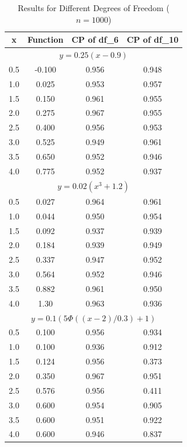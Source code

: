 \documentclass[12pt]{article}
\begin{document}
\begin{table}[ht]
  \centering
  \caption{Results for Different Degrees of Freedom (\(n = 1000\))}
  \label{Table2}
  \begin{tabular}{|c|c|c|c|}
    \hline
    \textbf{x} & \textbf{Function} & \textbf{CP of df\_6} & \textbf{CP of df\_10} \\
    \hline
    \multicolumn{4}{|c|}{\(y = 0.25(x - 0.9)\)} \\
    \hline
    0.5 & -0.100 & 0.956 & 0.948 \\
    \hline
    1.0 & 0.025 & 0.953 & 0.957 \\
    \hline
    1.5 & 0.150 & 0.961 & 0.955 \\
    \hline
    2.0 & 0.275 & 0.967 & 0.955 \\
    \hline
    2.5 & 0.400 & 0.956 & 0.953 \\
    \hline
    3.0 & 0.525 & 0.949 & 0.961 \\
    \hline
    3.5 & 0.650 & 0.952 & 0.946 \\
    \hline
    4.0 & 0.775 & 0.952 & 0.937 \\
    \hline
    \multicolumn{4}{|c|}{\(y = 0.02(x^3+1.2)\)} \\
    \hline
    0.5 & 0.027 & 0.964 & 0.961 \\
    \hline
    1.0 & 0.044 & 0.950 & 0.954 \\
    \hline
    1.5 & 0.092 & 0.937 & 0.939 \\
    \hline
    2.0 & 0.184 & 0.939 & 0.949 \\
    \hline
    2.5 & 0.337 & 0.947 & 0.952 \\
    \hline
    3.0 & 0.564 & 0.952 & 0.946 \\
    \hline
    3.5 & 0.882 & 0.961 & 0.950 \\
    \hline
    4.0 & 1.30 & 0.963 & 0.936 \\
    \hline
    \multicolumn{4}{|c|}{\(y = 0.1 (5\Phi((x - 2) / 0.3) + 1)\)} \\
    \hline
    0.5 & 0.100 & 0.956 & 0.934 \\
    \hline
    1.0 & 0.100 & 0.936 & 0.912 \\
    \hline
    1.5 & 0.124 & 0.956 & 0.373 \\
    \hline
    2.0 & 0.350 & 0.967 & 0.951 \\
    \hline
    2.5 & 0.576 & 0.956 & 0.411 \\
    \hline
    3.0 & 0.600 & 0.954 & 0.905 \\
    \hline
    3.5 & 0.600 & 0.951 & 0.922 \\
    \hline
    4.0 & 0.600 & 0.946 & 0.837 \\
    \hline
  \end{tabular}
\end{table}
\end{document}

